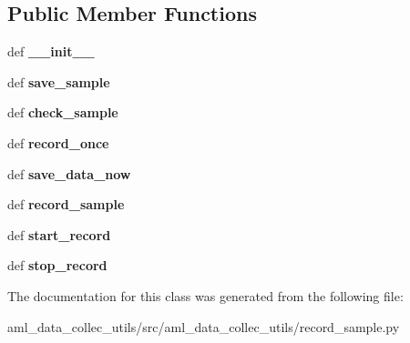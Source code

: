 \subsection*{Public Member Functions}
\begin{DoxyCompactItemize}
\item 
\hypertarget{classaml__data__collec__utils_1_1record__sample_1_1_record_sample_af435fef79e388ef67f492fef687ff01e}{def {\bfseries \-\_\-\-\_\-init\-\_\-\-\_\-}}\label{classaml__data__collec__utils_1_1record__sample_1_1_record_sample_af435fef79e388ef67f492fef687ff01e}

\item 
\hypertarget{classaml__data__collec__utils_1_1record__sample_1_1_record_sample_ae0201f9b1cc2913f286074de2b411a68}{def {\bfseries save\-\_\-sample}}\label{classaml__data__collec__utils_1_1record__sample_1_1_record_sample_ae0201f9b1cc2913f286074de2b411a68}

\item 
\hypertarget{classaml__data__collec__utils_1_1record__sample_1_1_record_sample_a73488eee65bdd3f16b0abc321c2e3896}{def {\bfseries check\-\_\-sample}}\label{classaml__data__collec__utils_1_1record__sample_1_1_record_sample_a73488eee65bdd3f16b0abc321c2e3896}

\item 
\hypertarget{classaml__data__collec__utils_1_1record__sample_1_1_record_sample_acb6b8882c9d5a545439cfd83e29892ba}{def {\bfseries record\-\_\-once}}\label{classaml__data__collec__utils_1_1record__sample_1_1_record_sample_acb6b8882c9d5a545439cfd83e29892ba}

\item 
\hypertarget{classaml__data__collec__utils_1_1record__sample_1_1_record_sample_a3e420419249ba8f875c94e5f93014262}{def {\bfseries save\-\_\-data\-\_\-now}}\label{classaml__data__collec__utils_1_1record__sample_1_1_record_sample_a3e420419249ba8f875c94e5f93014262}

\item 
\hypertarget{classaml__data__collec__utils_1_1record__sample_1_1_record_sample_a3c3880c14fcdf3e291383c66b1b5632e}{def {\bfseries record\-\_\-sample}}\label{classaml__data__collec__utils_1_1record__sample_1_1_record_sample_a3c3880c14fcdf3e291383c66b1b5632e}

\item 
\hypertarget{classaml__data__collec__utils_1_1record__sample_1_1_record_sample_abbd5eeab281bc126be462f4aa0fc6bfd}{def {\bfseries start\-\_\-record}}\label{classaml__data__collec__utils_1_1record__sample_1_1_record_sample_abbd5eeab281bc126be462f4aa0fc6bfd}

\item 
\hypertarget{classaml__data__collec__utils_1_1record__sample_1_1_record_sample_a2b738c1ff617d95969200ec895e484e2}{def {\bfseries stop\-\_\-record}}\label{classaml__data__collec__utils_1_1record__sample_1_1_record_sample_a2b738c1ff617d95969200ec895e484e2}

\end{DoxyCompactItemize}


The documentation for this class was generated from the following file\-:\begin{DoxyCompactItemize}
\item 
aml\-\_\-data\-\_\-collec\-\_\-utils/src/aml\-\_\-data\-\_\-collec\-\_\-utils/record\-\_\-sample.\-py\end{DoxyCompactItemize}
